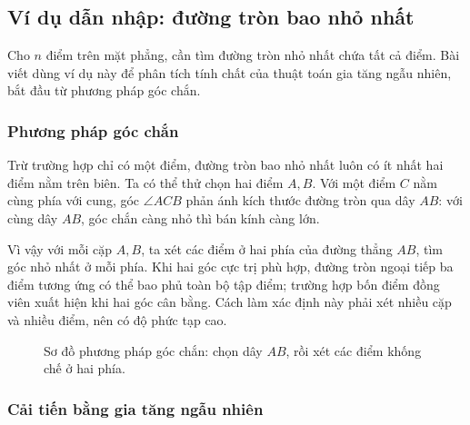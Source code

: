 \documentclass[11pt]{article}
\begin{document}
\subsection{Ví dụ dẫn nhập: đường tròn bao nhỏ nhất}

Cho \(n\) điểm trên mặt phẳng, cần tìm đường tròn nhỏ nhất chứa tất cả điểm.
Bài viết dùng ví dụ này để phân tích tính chất của thuật toán gia tăng ngẫu
nhiên, bắt đầu từ phương pháp góc chắn.

\subsubsection{Phương pháp góc chắn}

Trừ trường hợp chỉ có một điểm, đường tròn bao nhỏ nhất luôn có ít nhất hai
điểm nằm trên biên. Ta có thể thử chọn hai điểm \(A,B\). Với một điểm \(C\)
nằm cùng phía với cung, góc \(\angle ACB\) phản ánh kích thước đường tròn qua
dây \(AB\): với cùng dây \(AB\), góc chắn càng nhỏ thì bán kính càng lớn.

Vì vậy với mỗi cặp \(A,B\), ta xét các điểm ở hai phía của đường thẳng
\(AB\), tìm góc nhỏ nhất ở mỗi phía. Khi hai góc cực trị phù hợp, đường tròn
ngoại tiếp ba điểm tương ứng có thể bao phủ toàn bộ tập điểm; trường hợp bốn
điểm đồng viên xuất hiện khi hai góc cân bằng. Cách làm xác định này phải xét
nhiều cặp và nhiều điểm, nên có độ phức tạp cao.

\begin{figure}[htbp]
\centering
{}
\caption{Sơ đồ phương pháp góc chắn: chọn dây \(AB\), rồi xét các điểm khống chế ở hai phía.}
\end{figure}

\subsubsection{Cải tiến bằng gia tăng ngẫu nhiên}
\end{document}
